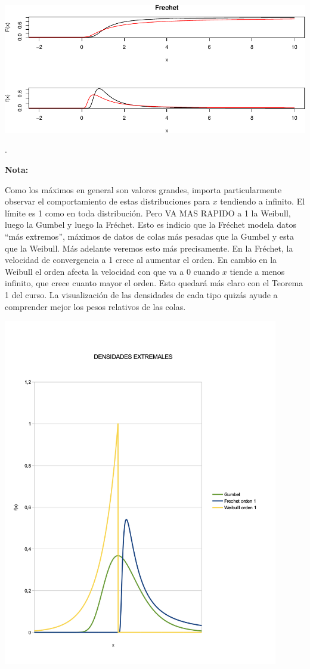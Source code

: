 \documentclass[
  oneside]{book}
\begin{document}
\includegraphics{extremales_files/figure-latex/unnamed-chunk-11-1.pdf}

.

\textbf{Nota:}

Como los máximos en general son valores grandes, importa particularmente
observar el comportamiento de estas distribuciones para \(x\) tendiendo
a infinito. El límite es 1 como en toda distribución. Pero VA MAS RAPIDO
a 1 la Weibull, luego la Gumbel y luego la Fréchet. Esto es indicio que
la Fréchet modela datos ``más extremos'', máximos de datos de colas más
pesadas que la Gumbel y esta que la Weibull. Más adelante veremos esto
más precisamente. En la Fréchet, la velocidad de convergencia a 1 crece
al aumentar el orden. En cambio en la Weibull el orden afecta la
velocidad con que va a 0 cuando \(x\) tiende a menos infinito, que crece
cuanto mayor el orden. Esto quedará más claro con el Teorema 1 del
curso. La visualización de las densidades de cada tipo quizás ayude a
comprender mejor los pesos relativos de las colas.

\newpage

\includegraphics[width=0.9\textwidth,height=\textheight]{images/p0.png}
\newpage
\end{document}
